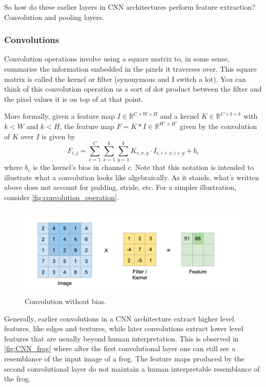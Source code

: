 \documentclass[11pt]{article}
\begin{document}
So how do these earlier layers in CNN architectures perform feature extraction? Convolution and pooling layers.

\subsubsection{Convolutions}
Convolution operations involve using a square matrix to, in some sense, summarise the information embedded in the pixels it traverses over. This square matrix is called the kernel or filter (synonymous and I switch a lot). You can think of this convolution operation as a sort of dot product between the filter and the pixel values it is on top of at that point.

More formally, given a feature map $I\in\mathbb{R}^{C\times W\times H}$ and a kernel $K\in\mathbb{R}^{C\times k\times k}$ with $k<W$ and $k<H$, the feature map $F=K*I\in\mathbb{R}^{W'\times H'}$ given by the convolution of $K$ over $I$ is given by
$$
F_{i,j}
=
\sum_{c=1}^C\sum_{x=1}^{k}\sum_{y=1}^{k}K_{c,x,y}\cdot I_{c,i+x,i+y}+b_c
$$
where $b_c$ is the kernel's bias in channel $c$. Note that this notation is intended to illustrate what a convolution looks like algebraically. As it stands, what's written above does not account for padding, stride, etc. For a simpler illustration, consider \autoref{fig:convolution_operation}.

\begin{figure}[ht]
    \centering
    \includegraphics[width=1\textwidth]{./figures/neural_nets/convolution.png}
    \caption{\centering Convolution without bias.}
    \label{fig:convolution_operation}
\end{figure}

\noindent Generally, earlier convolutions in a CNN architecture extract higher level features, like edges and textures, while later convolutions extract lower level features that are usually beyond human interpretation. This is observed in \autoref{fig:CNN_frog} where after the first convolutional layer one can still see a resemblance of the input image of a frog. The feature maps produced by the second convolutional layer do not maintain a human interpretable resemblance of the frog.
\end{document}
